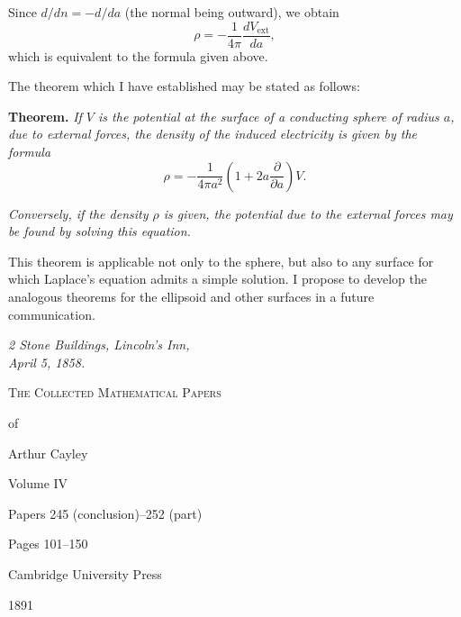 \documentclass[11pt,a4paper]{book}
\begin{document}
Since $d/dn = -d/da$ (the normal being outward), we obtain
\[
\rho = -\frac{1}{4\pi} \frac{dV_{\text{ext}}}{da},
\]
which is equivalent to the formula given above.

\setcounter{page}{100}

The theorem which I have established may be stated as follows:

\medskip
\noindent\textbf{Theorem.} \textit{If $V$ is the potential at the surface of a conducting sphere of radius $a$, due to external forces, the density of the induced electricity is given by the formula}
\[
\rho = -\frac{1}{4\pi a^2} \left(1 + 2a\frac{\partial}{\partial a}\right) V.
\]

\textit{Conversely, if the density $\rho$ is given, the potential due to the external forces may be found by solving this equation.}

\medskip
This theorem is applicable not only to the sphere, but also to any surface for which Laplace's equation admits a simple solution. I propose to develop the analogous theorems for the ellipsoid and other surfaces in a future communication.

\medskip
\noindent\textit{2 Stone Buildings, Lincoln's Inn,\\April 5, 1858.}
\clearpage


\thispagestyle{empty}
\begin{center}
\vspace*{2cm}
{\Huge\scshape The Collected Mathematical Papers\par\vspace{0.3em} of\par\vspace{0.5em} Arthur Cayley\par\vspace{1.5em}}
{\LARGE Volume IV\par\vspace{1em}}
{\large Papers 245 (conclusion)--252 (part)\par\vspace{0.5em}}
{\large Pages 101--150\par\vspace{2em}}
\vfill
{\large Cambridge University Press\par\vspace{0.3em}}
{\normalsize 1891}
\end{center}
\newpage
\end{document}
